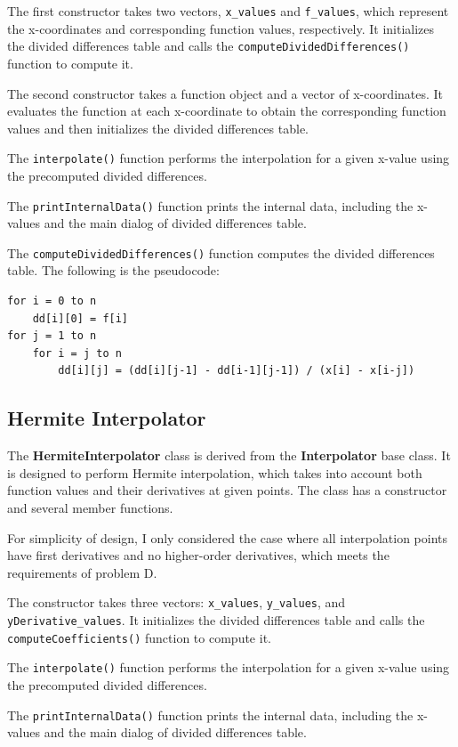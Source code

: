 \documentclass[a4paper]{article}
\begin{document}
The first constructor takes two vectors, \texttt{x\_values} and \texttt{f\_values}, which represent the x-coordinates and corresponding function values, respectively. It initializes the divided differences table and calls the \texttt{computeDividedDifferences()} function to compute it.

The second constructor takes a function object and a vector of x-coordinates. It evaluates the function at each x-coordinate to obtain the corresponding function values and then initializes the divided differences table.

The \texttt{interpolate()} function performs the interpolation for a given x-value using the precomputed divided differences.

The \texttt{printInternalData()} function prints the internal data, including the x-values and the main dialog of divided differences table.

The \texttt{computeDividedDifferences()} function computes the divided differences table. The following is the pseudocode:
\begin{lstlisting}
for i = 0 to n
    dd[i][0] = f[i]
for j = 1 to n
    for i = j to n
        dd[i][j] = (dd[i][j-1] - dd[i-1][j-1]) / (x[i] - x[i-j])
\end{lstlisting}

\subsection{Hermite Interpolator}
The \textbf{HermiteInterpolator} class is derived from the \textbf{Interpolator} base class. It is designed to perform Hermite interpolation, which takes into account both function values and their derivatives at given points. The class has a constructor and several member functions.

For simplicity of design, I only considered the case where all interpolation points have first derivatives and no higher-order derivatives, which meets the requirements of problem D.

The constructor takes three vectors: \texttt{x\_values}, \texttt{y\_values}, and \texttt{yDerivative\_values}. It initializes the divided differences table and calls the \texttt{computeCoefficients()} function to compute it.

The \texttt{interpolate()} function performs the interpolation for a given x-value using the precomputed divided differences.

The \texttt{printInternalData()} function prints the internal data, including the x-values and the main dialog of divided differences table.
\end{document}
